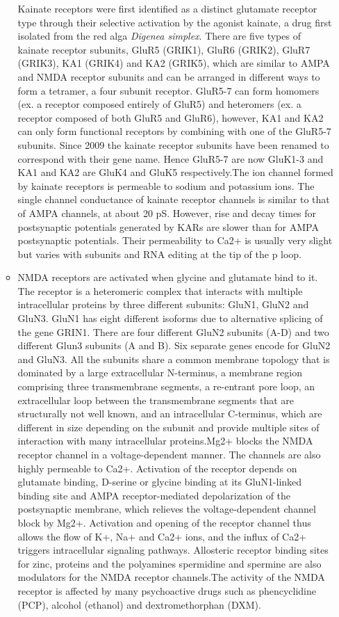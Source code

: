 \documentclass[]{book}
\begin{document}
\begin{itemize}
\begin{itemize}
    Kainate receptors were first identified as a distinct glutamate receptor type through their selective activation by the agonist kainate, a drug first isolated from the red alga \emph{Digenea simplex}. There are five types of kainate receptor subunits, GluR5 (GRIK1), GluR6 (GRIK2), GluR7 (GRIK3), KA1 (GRIK4) and KA2 (GRIK5), which are similar to AMPA and NMDA receptor subunits and can be arranged in different ways to form a tetramer, a four subunit receptor. GluR5-7 can form homomers (ex. a receptor composed entirely of GluR5) and heteromers (ex. a receptor composed of both GluR5 and GluR6), however, KA1 and KA2 can only form functional receptors by combining with one of the GluR5-7 subunits. Since 2009 the kainate receptor subunits have been renamed to correspond with their gene name. Hence GluR5-7 are now GluK1-3 and KA1 and KA2 are GluK4 and GluK5 respectively.The ion channel formed by kainate receptors is permeable to sodium and potassium ions. The single channel conductance of kainate receptor channels is similar to that of AMPA channels, at about 20 pS. However, rise and decay times for postsynaptic potentials generated by KARs are slower than for AMPA postsynaptic potentials. Their permeability to Ca2+ is usually very slight but varies with subunits and RNA editing at the tip of the p loop.
  \item
    NMDA receptors are activated when glycine and glutamate bind to it. The receptor is a heteromeric complex that interacts with multiple intracellular proteins by three different subunits: GluN1, GluN2 and GluN3. GluN1 has eight different isoforms due to alternative splicing of the gene GRIN1. There are four different GluN2 subunits (A-D) and two different Glun3 subunits (A and B). Six separate genes encode for GluN2 and GluN3. All the subunits share a common membrane topology that is dominated by a large extracellular N-terminus, a membrane region comprising three transmembrane segments, a re-entrant pore loop, an extracellular loop between the transmembrane segments that are structurally not well known, and an intracellular C-terminus, which are different in size depending on the subunit and provide multiple sites of interaction with many intracellular proteins.Mg2+ blocks the NMDA receptor channel in a voltage-dependent manner. The channels are also highly permeable to Ca2+. Activation of the receptor depends on glutamate binding, D-serine or glycine binding at its GluN1-linked binding site and AMPA receptor-mediated depolarization of the postsynaptic membrane, which relieves the voltage-dependent channel block by Mg2+. Activation and opening of the receptor channel thus allows the flow of K+, Na+ and Ca2+ ions, and the influx of Ca2+ triggers intracellular signaling pathways. Allosteric receptor binding sites for zinc, proteins and the polyamines spermidine and spermine are also modulators for the NMDA receptor channels.The activity of the NMDA receptor is affected by many psychoactive drugs such as phencyclidine (PCP), alcohol (ethanol) and dextromethorphan (DXM).

\end{itemize}
\end{itemize}
\end{document}
